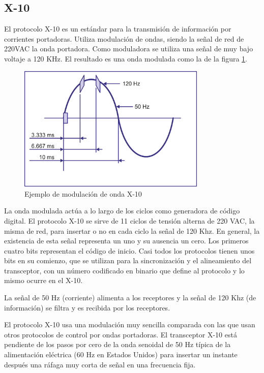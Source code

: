 \subsection{X-10}
El protocolo X-10 es un est\'andar para la transmisión de información por corrientes portadoras. Utiliza modulación de ondas, siendo la señal de red de 220VAC la onda portadora. Como moduladora se utiliza una señal de muy bajo voltaje a 120 KHz. El resultado es una onda modulada como la de la figura \ref{fig:modulacionx10}.

\begin{figure}[htbp]
	\centering
		\includegraphics[width=0.8\textwidth]{imagenes/image_x10.png}
	\caption{Ejemplo de modulación de onda X-10}
	\label{fig:modulacionx10}
\end{figure}


La onda modulada actúa a lo largo de los ciclos como generadora de código digital. El protocolo X-10 se sirve de 11 ciclos de tensión alterna de 220 VAC, la misma de red, para insertar o no en cada ciclo la señal de 120 Khz. En general, la existencia de esta señal representa un uno y su ausencia un cero. Los primeros cuatro bits representan el código de inicio. Casi todos los protocolos tienen unos bits en su comienzo, que se utilizan para la sincronización y el alineamiento del transceptor, con un número codificado en binario que define al protocolo y lo mismo ocurre en el X-10.


La señal de 50 Hz (corriente) alimenta a los receptores y la señal de 120 Khz (de información) se filtra y es recibida por los receptores.


El protocolo X-10 usa una modulación muy sencilla comparada con las que usan otros protocolos de control por ondas portadoras. El transceptor X-10 est\'a pendiente de los pasos por cero de la onda senoidal de 50 Hz típica de la alimentación eléctrica (60 Hz en Estados Unidos) para insertar un instante después una r\'afaga muy corta de señal en una frecuencia fija.


